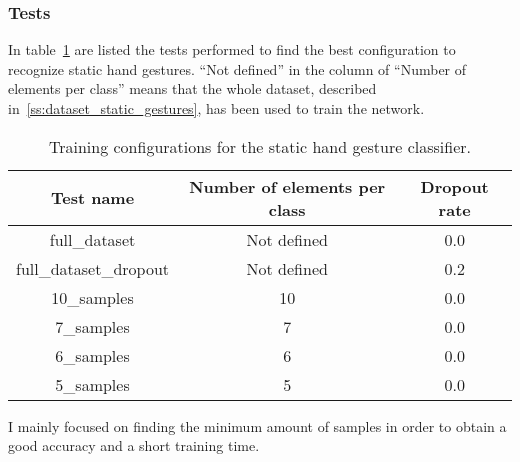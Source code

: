 \documentclass[../thesis.tex]{subfiles}
\begin{document}
\subsubsection{Tests}
In table~\ref{tab:tests_static_hand_gestures} are listed the tests performed to find the best configuration to recognize static hand gestures. ``Not defined'' in the column of ``Number of elements per class'' means that the whole dataset, described in~\ref{ss:dataset_static_gestures}, has been used to train the network.
\begin{table}[H]
\begin{tabular}{|c|c|c|}
\hline
\textbf{Test name}          & \textbf{Number of elements per class} & \textbf{Dropout rate} \\ \hline
full\_dataset               & Not defined                           & 0.0                   \\ \hline
full\_dataset\_dropout & Not defined                           & 0.2                   \\ \hline
10\_samples                 & 10                                    & 0.0                   \\ \hline
7\_samples                  & 7                                     & 0.0                   \\ \hline
6\_samples                  & 6                                     & 0.0                   \\ \hline
5\_samples                  & 5                                     & 0.0                   \\ \hline
\end{tabular}
\caption{Training configurations for the static hand gesture classifier.}\label{tab:tests_static_hand_gestures}
\end{table}
I mainly focused on finding the minimum amount of samples in order to obtain a good accuracy and a short training time. 
\end{document}
